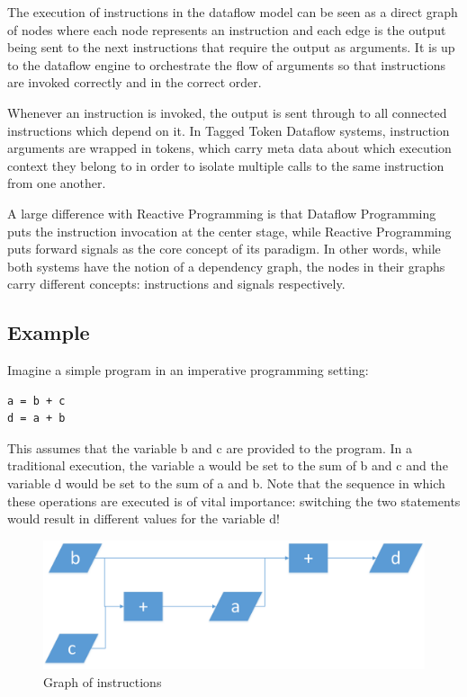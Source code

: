 The execution of instructions in the dataflow model can be seen as a direct graph of nodes where each node represents an instruction and each edge is the output being sent to the next instructions that require the output as arguments. It is up to the dataflow engine to orchestrate the flow of arguments so that instructions are invoked correctly and in the correct order.

Whenever an instruction is invoked, the output is sent through to all connected instructions which depend on it. In Tagged Token Dataflow systems, instruction arguments are wrapped in tokens, which carry meta data about which execution context they belong to in order to isolate multiple calls to the same instruction from one another.

A large difference with Reactive Programming is that Dataflow Programming puts the instruction invocation at the center stage, while Reactive Programming puts forward signals as the core concept of its paradigm. In other words, while both systems have the notion of a dependency graph, the nodes in their graphs carry different concepts: instructions and signals respectively.
 
\newpage

\subsection{Example}

Imagine a simple program in an imperative programming setting:

\begin{lstlisting}
a = b + c
d = a + b
\end{lstlisting}

This assumes that the variable b and c are provided to the program.
In a traditional execution, the variable a would be set to the sum of b and c and the variable d would be set to the sum of a and b. Note that the sequence in which these operations are executed is of vital importance: switching the two statements would result in different values for the variable d!

\begin{figure}[h]
    \centerline{\includegraphics[width=\textwidth]{images/background-dataflow-example.png}}
	\caption{Graph of instructions}
	\label{fig:background-dataflow-example}
\end{figure}

